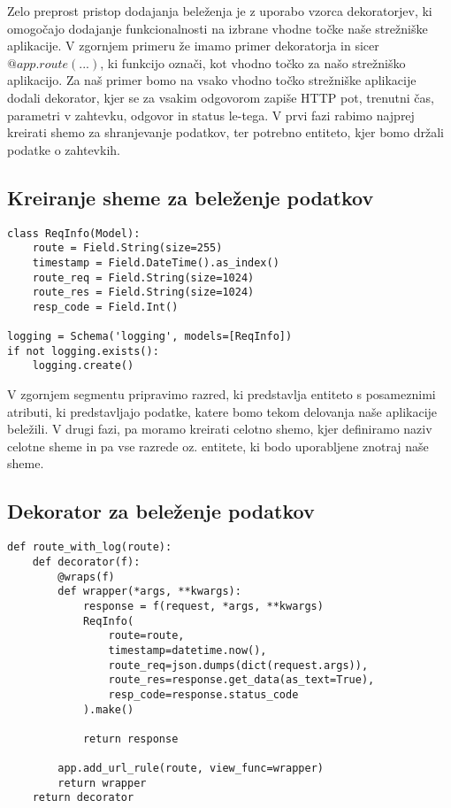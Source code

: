 \documentclass[a4paper,12pt,openright]{book}
\begin{document}
    \noindent
    Zelo preprost pristop dodajanja beleženja je z uporabo vzorca dekoratorjev, ki omogočajo dodajanje funkcionalnosti na izbrane vhodne točke naše strežniške aplikacije. V zgornjem primeru že imamo primer dekoratorja in sicer $@app.route(...)$, ki funkcijo označi, kot vhodno točko za našo strežniško aplikacijo. Za naš primer bomo na vsako vhodno točko strežniške aplikacije dodali dekorator, kjer se za vsakim odgovorom zapiše HTTP pot, trenutni čas, parametri v zahtevku, odgovor in status le-tega. V prvi fazi rabimo najprej kreirati shemo za shranjevanje podatkov, ter potrebno entiteto, kjer bomo držali podatke o zahtevkih.

    \subsection{Kreiranje sheme za beleženje podatkov}
\begin{verbatim}
class ReqInfo(Model):
    route = Field.String(size=255)
    timestamp = Field.DateTime().as_index()
    route_req = Field.String(size=1024)
    route_res = Field.String(size=1024)
    resp_code = Field.Int()

logging = Schema('logging', models=[ReqInfo])
if not logging.exists():
    logging.create()
\end{verbatim}

    \noindent
    V zgornjem segmentu pripravimo razred, ki predstavlja entiteto s posameznimi atributi, ki predstavljajo podatke, katere bomo tekom delovanja naše aplikacije beležili. V drugi fazi, pa moramo kreirati celotno shemo, kjer definiramo naziv celotne sheme in pa vse razrede oz. entitete, ki bodo uporabljene znotraj naše sheme.

    \newpage
    \subsection{Dekorator za beleženje podatkov}

\begin{verbatim}
def route_with_log(route):
    def decorator(f):
        @wraps(f)
        def wrapper(*args, **kwargs):
            response = f(request, *args, **kwargs)
            ReqInfo(
                route=route,
                timestamp=datetime.now(),
                route_req=json.dumps(dict(request.args)),
                route_res=response.get_data(as_text=True),
                resp_code=response.status_code
            ).make()

            return response
        
        app.add_url_rule(route, view_func=wrapper)
        return wrapper
    return decorator
\end{verbatim}
\end{document}
